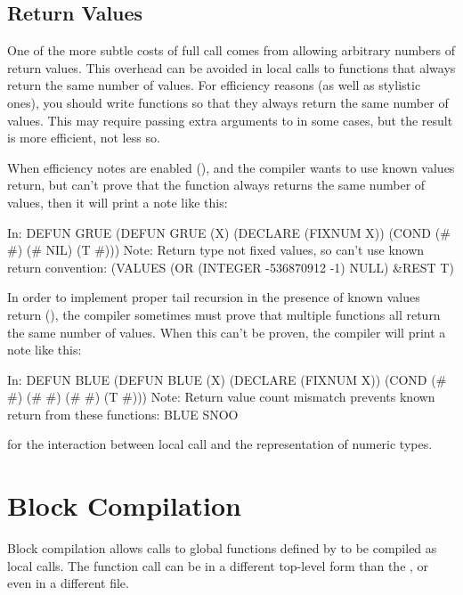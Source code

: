 \subsection{Return Values}
\label{local-call-return}

One of the more subtle costs of full call comes from allowing
arbitrary numbers of return values.  This overhead can be avoided in
local calls to functions that always return the same number of values.
For efficiency reasons (as well as stylistic ones), you should write
functions so that they always return the same number of values.  This
may require passing extra \false{} arguments to  in some
cases, but the result is more efficient, not less so.

When efficiency notes are enabled (), and the
compiler wants to use known values return, but can't prove that the
function always returns the same number of values, then it will print
a note like this:
\begin{example}
In: DEFUN GRUE
  (DEFUN GRUE (X) (DECLARE (FIXNUM X)) (COND (# #) (# NIL) (T #)))
Note: Return type not fixed values, so can't use known return convention:
  (VALUES (OR (INTEGER -536870912 -1) NULL) &REST T)
\end{example}

In order to implement proper tail recursion in the presence of known
values return (), the compiler sometimes must
prove that multiple functions all return the same number of values.
When this can't be proven, the compiler will print a note like this:
\begin{example}
In: DEFUN BLUE
  (DEFUN BLUE (X) (DECLARE (FIXNUM X)) (COND (# #) (# #) (# #) (T #)))
Note: Return value count mismatch prevents known return from
      these functions:
  BLUE
  SNOO
\end{example}
 for the interaction between local call
and the representation of numeric types.


\section{Block Compilation}
\label{block-compilation}

Block compilation allows calls to global functions defined by
 to be compiled as local calls.  The function call
can be in a different top-level form than the , or even in a
different file.

